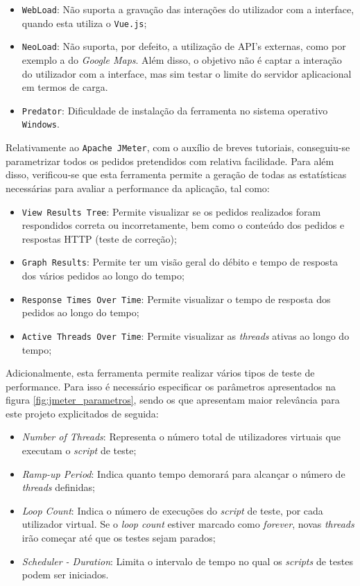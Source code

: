 \begin{itemize}
    \item \texttt{WebLoad}: Não suporta a gravação das interações do utilizador com a interface, quando esta utiliza o \texttt{Vue.js};
    \item \texttt{NeoLoad}: Não suporta, por defeito, a utilização de API's externas, como por exemplo a do \textit{Google Maps}. Além disso, o objetivo não é captar a interação do utilizador com a interface, mas sim testar o limite do servidor aplicacional em termos de carga.
    \item \texttt{Predator}: Dificuldade de instalação da ferramenta no sistema operativo \texttt{Windows}.
\end{itemize}

Relativamente ao \texttt{Apache JMeter}, com o auxílio de breves tutoriais, conseguiu-se parametrizar todos os pedidos pretendidos com relativa facilidade. Para além disso, verificou-se que esta ferramenta permite a geração de todas as estatísticas necessárias para avaliar a performance da aplicação, tal como:

\begin{itemize}
    \item \texttt{View Results Tree}: Permite visualizar se os pedidos realizados foram respondidos correta ou incorretamente, bem como o conteúdo dos pedidos e respostas HTTP (teste de correção);
    \item \texttt{Graph Results}: Permite ter um visão geral do débito e tempo de resposta dos vários pedidos ao longo do tempo;
    \item \texttt{Response Times Over Time}: Permite visualizar o tempo de resposta dos pedidos ao longo do tempo;
    \item \texttt{Active Threads Over Time}: Permite visualizar as \textit{threads} ativas ao longo do tempo;
\end{itemize}

Adicionalmente, esta ferramenta permite realizar vários tipos de teste de performance. Para isso é necessário especificar os parâmetros apresentados na figura \ref{fig:jmeter_parametros}, sendo os que apresentam maior relevância para este projeto explicitados de seguida:

\begin{itemize}
    \item \textit{Number of Threads}: Representa o número total de utilizadores virtuais que executam o \textit{script} de teste;
    \item \textit{Ramp-up Period}: Indica quanto tempo demorará para alcançar o número de \textit{threads} definidas;
    \item \textit{Loop Count}: Indica o número de execuções do \textit{script} de teste, por cada utilizador virtual. Se o \textit{loop count} estiver marcado como \textit{forever}, novas \textit{threads} irão começar até que os testes sejam parados; 
    \item \textit{Scheduler - Duration}: Limita o intervalo de tempo no qual os \textit{scripts} de testes podem ser iniciados.
\end{itemize}

